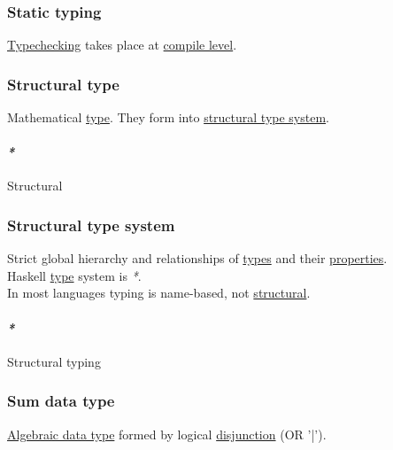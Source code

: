 \documentclass[11pt]{article}
\begin{document}
\subsubsection{\label{org959fbb9}Static typing}
\label{sec:org73654bd}
\hyperref[org64d9d33]{Typechecking} takes place at \hyperref[org9c39e37]{compile level}.\\

\subsubsection{\label{org398b5cd}Structural type}
\label{sec:org60c2d33}
Mathematical \hyperref[orgc4aea2f]{type}. They form into \hyperref[orgf9e54a4]{structural type system}.\\

\paragraph{\emph{*}}
\label{sec:orgd07d963}

\label{org57ccb74}Structural\\

\subsubsection{\label{orgf9e54a4}Structural type system}
\label{sec:org9d7ded6}
Strict global hierarchy and relationships of \hyperref[org4209edd]{types} and their \hyperref[org85fb3a1]{properties}.\\
Haskell \hyperref[orgc4aea2f]{type} system is \emph{*}.\\
In most languages typing is name-based, not \hyperref[org57ccb74]{structural}.\\

\paragraph{\emph{*}}
\label{sec:org7662848}

\label{org45a97d7}Structural typing\\

\subsubsection{\label{org8225857}Sum data type}
\label{sec:org5101218}
\hyperref[org2278a14]{Algebraic data type} formed by logical \hyperref[org3588607]{disjunction} (OR '|').\\
\end{document}

